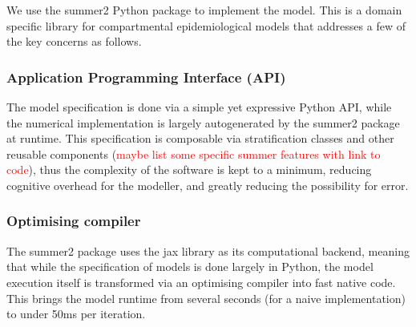 
We use the summer2 Python package to implement the model.  This is a domain specific library for 
compartmental epidemiological models that addresses a few of the key concerns as follows.

\subsubsection{Application Programming Interface (API)}
The model specification is done via a simple yet expressive Python API, 
while the numerical implementation is largely autogenerated by the summer2 package at runtime. 
This specification is composable via stratification classes and other reusable components (\textcolor{red}{maybe list some specific summer features with link to code}), 
thus the complexity of the software is kept to a minimum, reducing cognitive overhead for the modeller, and greatly reducing the possibility for error.

\subsubsection{Optimising compiler}
The summer2 package uses the jax library as its computational backend, meaning that while the specification of models is done largely in Python, 
the model execution itself is transformed via an optimising compiler into fast native code.
This brings the model runtime from several seconds (for a naive implementation) to under 50ms per iteration.




